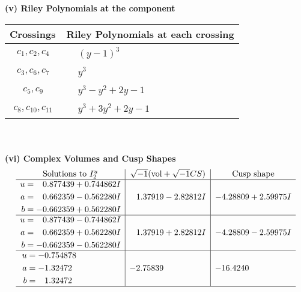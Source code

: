 \documentclass[1p]{elsarticle_modified}
\theoremstyle{definition}
\newcommand{\I}{\sqrt{-1}}
\begin{document}
\newpage\renewcommand{\arraystretch}{1}
\flushleft \textbf{(v) Riley Polynomials at the component}\newline \\
\begin{tabular}{m{50pt}|m{274pt}}
Crossings & \hspace{64pt}Riley Polynomials at each crossing \\
\hline $$\begin{aligned}c_{1},c_{2},c_{4}\end{aligned}$$&$\begin{aligned}
&(y-1)^3
\end{aligned}$\\
\hline $$\begin{aligned}c_{3},c_{6},c_{7}\end{aligned}$$&$\begin{aligned}
&y^3
\end{aligned}$\\
\hline $$\begin{aligned}c_{5},c_{9}\end{aligned}$$&$\begin{aligned}
&y^3- y^2+2 y-1
\end{aligned}$\\
\hline $$\begin{aligned}c_{8},c_{10},c_{11}\end{aligned}$$&$\begin{aligned}
&y^3+3 y^2+2 y-1
\end{aligned}$\\
\hline
\end{tabular}\\~\\
\newpage\flushleft \textbf{(vi) Complex Volumes and Cusp Shapes}
$$\begin{array}{c|c|c}  
\text{Solutions to }I^u_{2}& \I (\text{vol} + \sqrt{-1}CS) & \text{Cusp shape}\\
 \hline 
\begin{aligned}
u &= \phantom{-}0.877439 + 0.744862 I \\
a &= \phantom{-}0.662359 - 0.562280 I \\
b &= -0.662359 + 0.562280 I\end{aligned}
 & \phantom{-}1.37919 - 2.82812 I & -4.28809 + 2.59975 I \\ \hline\begin{aligned}
u &= \phantom{-}0.877439 - 0.744862 I \\
a &= \phantom{-}0.662359 + 0.562280 I \\
b &= -0.662359 - 0.562280 I\end{aligned}
 & \phantom{-}1.37919 + 2.82812 I & -4.28809 - 2.59975 I \\ \hline\begin{aligned}
u &= -0.754878\phantom{ +0.000000I} \\
a &= -1.32472\phantom{ +0.000000I} \\
b &= \phantom{-}1.32472\phantom{ +0.000000I}\end{aligned}
 & -2.75839\phantom{ +0.000000I} & -16.4240\phantom{ +0.000000I}\\
 \hline 
 \end{array}$$\newpage
\end{document}
